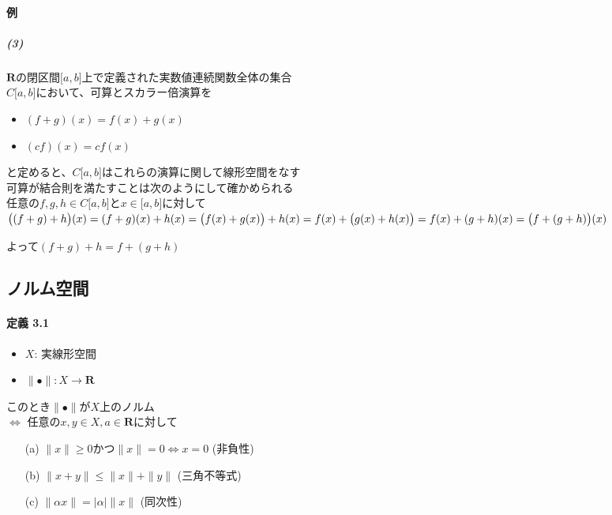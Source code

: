 \documentclass[12pt,a4paper]{article}
\begin{document}
  \paragraph{例}
     \subparagraph{(3)}
      $\mathbf{R}$の閉区間$\lbrack a, b \rbrack$上で定義された実数値連続関数全体の集合 \\
      $C\lbrack a, b \rbrack$において、可算とスカラー倍演算を
      \begin{itemize}
        \item $(f + g) (x) = f( x) + g (x)$
        \item $(cf) (x) = c f (x)$
      \end{itemize}
      と定めると、$C\lbrack a, b \rbrack$はこれらの演算に関して線形空間をなす \\
      可算が結合則を満たすことは次のようにして確かめられる \\
      任意の$f, g, h \in C \lbrack a, b \rbrack$と$x \in \lbrack a, b \rbrack$に対して \\
      \begin{math}
        \big( (f + g) + h \big) (x) = (f + g) (x) + h(x) \\
        =  \big(f(x) + g(x) \big) + h(x) \\
        = f(x) + \big(g(x) + h(x)\big) \\
        = f(x) + (g + h) (x) \\
      = \big(f+ (g + h) \big) (x) \end{math}

      よって$(f+ g) + h = f + (g + h)$
      \setcounter{section}{3}
      \subsection{ノルム空間}
        \paragraph{定義 3.1}
        \begin{itemize}
          \item $X$: 実線形空間
          \item $\parallel \bullet \parallel : X \rightarrow \mathbf{R}$
        \end{itemize}

        このとき$\parallel \bullet \parallel$が$X$上のノルム \\
        $\Leftrightarrow$ 任意の$x, y \in X, a \in \mathbf{R}$に対して \\
        \begin{itemize}
          \item[(a)] $\parallel x \parallel \geq 0$かつ$\parallel x \parallel = 0 \Leftrightarrow x = 0$ (非負性)
          \item[(b)] $\parallel x + y \parallel \leq \parallel x \parallel + \parallel y \parallel$ (三角不等式)
          \item[(c)] $\parallel \alpha x \parallel = \mid\alpha\mid \parallel x \parallel$ (同次性)
        \end{itemize}
\end{document}
